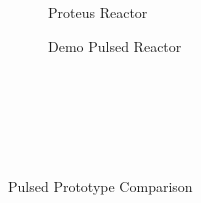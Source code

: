 \begin{table}[h!]
\begin{subtable}[t]{0.5\textwidth}
\begin{tabular}{ c|c }
\end{tabular}
\end{subtable}
\hfill
\hfill
\label{table:charybdis}
\end{table}

\clearpage

\newpage

\begin{figure*}[h!]
    \centering
    \hfill 
    \begin{subfigure}[t]{0.45\textwidth}
        \centering
    \begin{adjustbox}{width=\textwidth}
      \Large
      
    \end{adjustbox}
        \caption{Proteus Reactor}
    \end{subfigure}
    \hfill
    \begin{subfigure}[t]{0.45\textwidth}
        \centering
    \begin{adjustbox}{width=\textwidth}
      \Large
      
    \end{adjustbox}
        \caption{Demo Pulsed Reactor}
    \end{subfigure}
    \hfill \hfill ~\\ ~\\ ~\\
    \caption{Pulsed Prototype Comparison} ~\\
    \label{fig:proteus}
\end{figure*}

